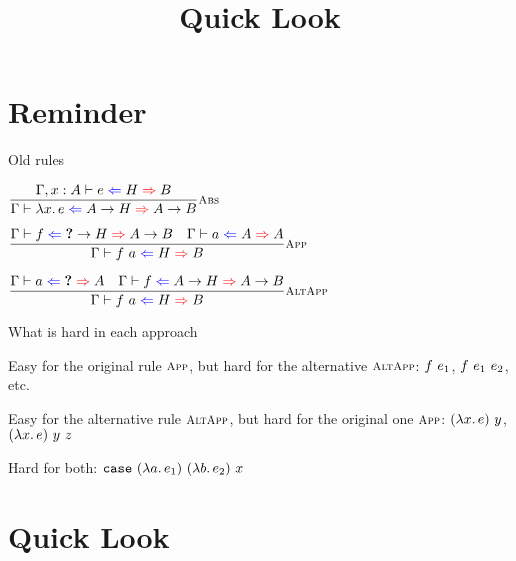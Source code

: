 \documentclass{beamer}
\title{Quick Look}
\date{}
\begin{document}
\frame{\titlepage}

\section{Reminder}

\begin{frame}{Old rules}

\begin{center}
  $\infrule[Abs]{\hinting[\extend{\Gamma}{x}{A}]{e}{H}{B}}{\hinting{\fun{x}{e}}{\Fun{A}{H}}{\Fun{A}{B}}}$

  \vspace{2em}

  $\infrule[App]{\hinting{f}{\Fun{\Hole}{H}}{\Fun{A}{B}} \quad \hinting{a}{A}{A}}{\hinting{\app{f}{a}}{H}{B}}$

  \vspace{2em}

  $\infrule[AltApp]{\hinting{a}{\Hole}{A} \quad \hinting{f}{\Fun{A}{H}}{\Fun{A}{B}}}{\hinting{\app{f}{a}}{H}{B}}$
\end{center}

\end{frame}

\begin{frame}{What is hard in each approach}

Easy for the original rule $\textsc{\footnotesize{App}}$, but hard for the alternative $\textsc{\footnotesize{AltApp}}$: $\app{f}{e_1}$, $\app{\app{f}{e_1}}{e_2}$, etc.

\vspace{2em}

Easy for the alternative rule $\textsc{\footnotesize{AltApp}}$, but hard for the original one $\textsc{\footnotesize{App}}$: $\app{(\fun{x}{e})}{y}$, $\app{\app{(\fun{x}{e})}{y}}{z}$

\vspace{2em}

Hard for both: $\app{\app{\app{\app{\casefun}{(\fun{a}{e_1})}}{(\fun{b}{e_2})}}{x}}{}$
\end{frame}

\section{Quick Look}

\end{document}
